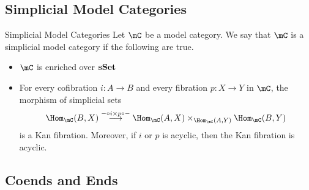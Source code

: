 \documentclass[a4paper]{article}
\begin{document}
\subsection{Simplicial Model Categories}
\begin{defn}{Simplicial Model Categories}{} Let $\mC$ be a model category. We say that $\mC$ is a simplicial model category if the following are true. 
\begin{itemize}
\item $\mC$ is enriched over $\bold{sSet}$
\item For every cofibration $i:A\to B$ and every fibration $p:X\to Y$ in $\mC$, the morphism of simplicial sets $$\Hom_\mC(B,X)\overset{-\circ i\times p\circ -}{\longrightarrow}\Hom_\mC(A,X)\times_{\Hom_\mC(A,Y)}\Hom_\mC(B,Y)$$ is a Kan fibration. Moreover, if $i$ or $p$ is acyclic, then the Kan fibration is acyclic. 
\end{itemize}
\end{defn}

\subsection{Coends and Ends}
\end{document}
